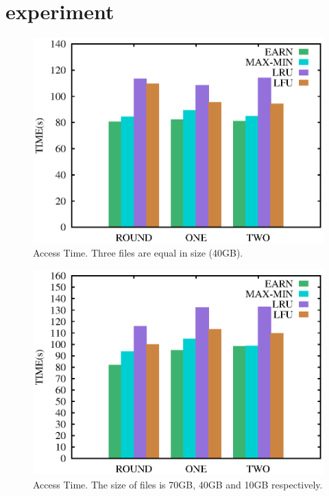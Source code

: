 \documentclass[10pt,conference,letterpaper]{IEEEtran}
\begin{document}
\section{experiment}

\begin{figure}[!htbp]
\centering
\includegraphics[scale=0.4]{figures/scan444_time.eps}
\caption{Access Time. Three files are equal in size (40GB).}
\label{fig:time_444}
\end{figure}

\begin{figure}[!htbp]
\centering
\includegraphics[scale=0.4]{figures/scan741_time.eps}
\caption{Access Time. The size of files is 70GB, 40GB and 10GB respectively.}
\label{fig:time_741}
\end{figure}
\end{document}
